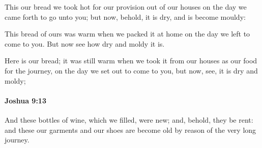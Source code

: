 			\begin{versebox}
					\item[BHS] 
					\item[ASV] This our bread we took hot for our provision out of our houses on the day we came forth to go unto you; but now, behold, it is dry, and is become mouldy:
					\item[NIV] This bread of ours was warm when we packed it at home on the day we left to come to you. But now see how dry and moldy it is.
					\item[NRSV] Here is our bread; it was still warm when we took it from our houses as our food for the journey, on the day we set out to come to you, but now, see, it is dry and moldy;
			\end{versebox}

		\paragraph{Joshua 9:13} %
			\label{JOSHUA-9-13}

			And these bottles of wine, which we filled, were new; and, behold, they be rent: and these our garments and our shoes are become old by reason of the very long journey.

